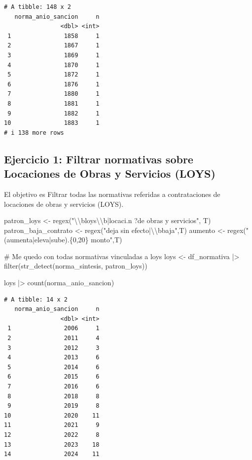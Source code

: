 \documentclass[
  letterpaper,
  DIV=11,
  numbers=noendperiod]{scrreprt}
\newenvironment{Shaded}{\begin{snugshade}}{\end{snugshade}}
\newcommand{\CommentTok}[1]{\textcolor[rgb]{0.37,0.37,0.37}{#1}}
\newcommand{\FunctionTok}[1]{\textcolor[rgb]{0.28,0.35,0.67}{#1}}
\newcommand{\NormalTok}[1]{\textcolor[rgb]{0.00,0.23,0.31}{#1}}
\newcommand{\OtherTok}[1]{\textcolor[rgb]{0.00,0.23,0.31}{#1}}
\newcommand{\SpecialCharTok}[1]{\textcolor[rgb]{0.37,0.37,0.37}{#1}}
\newcommand{\StringTok}[1]{\textcolor[rgb]{0.13,0.47,0.30}{#1}}
\begin{document}
\begin{verbatim}
# A tibble: 148 x 2
   norma_anio_sancion     n
                <dbl> <int>
 1               1858     1
 2               1867     1
 3               1869     1
 4               1870     1
 5               1872     1
 6               1876     1
 7               1880     1
 8               1881     1
 9               1882     1
10               1883     1
# i 138 more rows
\end{verbatim}

\subsection{Ejercicio 1: Filtrar normativas sobre Locaciones de Obras y
Servicios
(LOYS)}\label{ejercicio-1-filtrar-normativas-sobre-locaciones-de-obras-y-servicios-loys}

El objetivo es Filtrar todas las normativas referidas a contrataciones
de locaciones de obras y servicios (LOYS).

\begin{Shaded}
\begin{Highlighting}[]
\NormalTok{patron\_loys }\OtherTok{\textless{}{-}} \FunctionTok{regex}\NormalTok{(}\StringTok{"}\SpecialCharTok{\textbackslash{}\textbackslash{}}\StringTok{bloys}\SpecialCharTok{\textbackslash{}\textbackslash{}}\StringTok{b|locaci.n ?de obras y servicios"}\NormalTok{, T)}
\NormalTok{patron\_baja\_contrato }\OtherTok{\textless{}{-}} \FunctionTok{regex}\NormalTok{(}\StringTok{"deja sin efecto|}\SpecialCharTok{\textbackslash{}\textbackslash{}}\StringTok{bbaja"}\NormalTok{,T)}
\NormalTok{aumento }\OtherTok{\textless{}{-}} \FunctionTok{regex}\NormalTok{(}\StringTok{"(aumenta|eleva|sube).\{0,20\} monto"}\NormalTok{,T)}

\CommentTok{\# Me quedo con todas normativas vinculadas a loys}
\NormalTok{loys }\OtherTok{\textless{}{-}}\NormalTok{ df\_normativa  }\SpecialCharTok{|\textgreater{}} 
  \FunctionTok{filter}\NormalTok{(}\FunctionTok{str\_detect}\NormalTok{(norma\_sintesis, patron\_loys))}

\NormalTok{loys }\SpecialCharTok{|\textgreater{}} 
  \FunctionTok{count}\NormalTok{(norma\_anio\_sancion)}
\end{Highlighting}
\end{Shaded}

\begin{verbatim}
# A tibble: 14 x 2
   norma_anio_sancion     n
                <dbl> <int>
 1               2006     1
 2               2011     4
 3               2012     3
 4               2013     6
 5               2014     6
 6               2015     6
 7               2016     6
 8               2018     8
 9               2019     8
10               2020    11
11               2021     9
12               2022     8
13               2023    18
14               2024    11
\end{verbatim}
\end{document}
